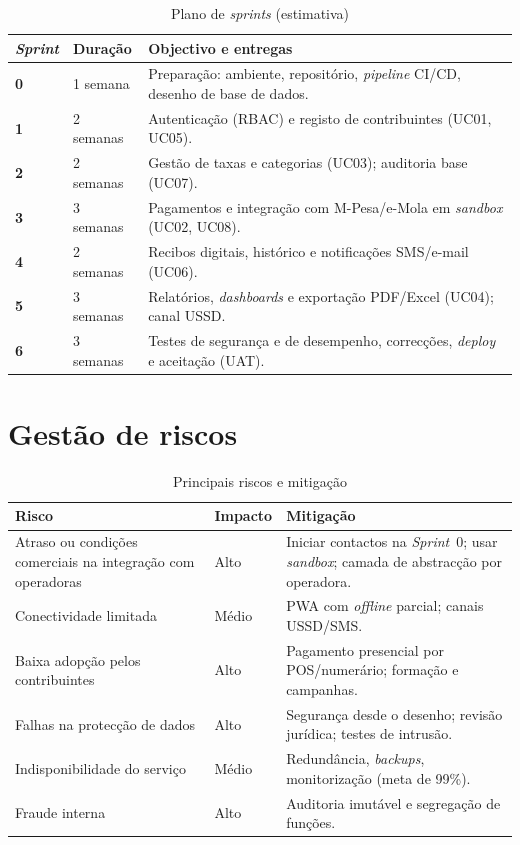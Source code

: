 \documentclass[12pt,a4paper,openany]{report}
\begin{document}
\begin{table}[!htbp]
\caption{Plano de \emph{sprints} (estimativa)}\label{tab:sprints}
\begingroup\singlespacing\small
\begin{tabularx}{\textwidth}{@{}>{\bfseries}p{2.3cm}p{2.2cm}X@{}}
\toprule
\emph{Sprint} & Duração & Objectivo e entregas \\
\midrule
0 & 1 semana & Preparação: ambiente, repositório, \emph{pipeline} CI/CD, desenho de base de dados. \\
1 & 2 semanas & Autenticação (RBAC) e registo de contribuintes (UC01, UC05). \\
2 & 2 semanas & Gestão de taxas e categorias (UC03); auditoria base (UC07). \\
3 & 3 semanas & Pagamentos e integração com M-Pesa/e-Mola em \emph{sandbox} (UC02, UC08). \\
4 & 2 semanas & Recibos digitais, histórico e notificações SMS/e-mail (UC06). \\
5 & 3 semanas & Relatórios, \emph{dashboards} e exportação PDF/Excel (UC04); canal USSD. \\
6 & 3 semanas & Testes de segurança e de desempenho, correcções, \emph{deploy} e aceitação (UAT). \\
\bottomrule
\end{tabularx}
\endgroup
\end{table}

\section{Gestão de riscos}
\begin{table}[!htbp]
\caption{Principais riscos e mitigação}\label{tab:riscos}
\begingroup\singlespacing\small
\begin{tabularx}{\textwidth}{@{}p{3.4cm}p{1.6cm}X@{}}
\toprule
Risco & Impacto & Mitigação \\
\midrule
Atraso ou condições comerciais na integração com operadoras & Alto & Iniciar contactos na \emph{Sprint}~0; usar \emph{sandbox}; camada de abstracção por operadora. \\
Conectividade limitada & Médio & PWA com \emph{offline} parcial; canais USSD/SMS. \\
Baixa adopção pelos contribuintes & Alto & Pagamento presencial por POS/numerário; formação e campanhas. \\
Falhas na protecção de dados & Alto & Segurança desde o desenho; revisão jurídica; testes de intrusão. \\
Indisponibilidade do serviço & Médio & Redundância, \emph{backups}, monitorização (meta de 99\%). \\
Fraude interna & Alto & Auditoria imutável e segregação de funções. \\
\bottomrule
\end{tabularx}
\endgroup
\end{table}
\end{document}
